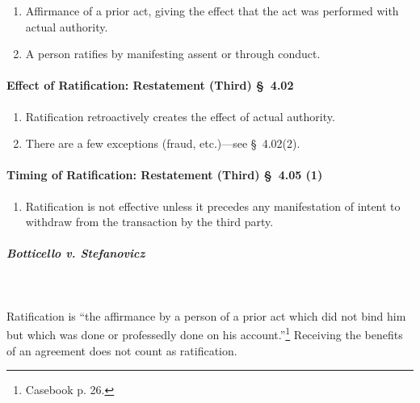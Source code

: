 \begin{enumerate}
    \item Affirmance of a prior act, giving the effect that the act was 
    performed with actual authority.
    \item A person ratifies by manifesting assent or through conduct.
\end{enumerate}

\paragraph{Effect of Ratification: Restatement (Third) \S\ 4.02}

\begin{enumerate}
    \item Ratification retroactively creates the effect of actual authority.
    \item There are a few exceptions (fraud, etc.)---see \S\ 4.02(2).
\end{enumerate}

\paragraph{Timing of Ratification: Restatement (Third) \S\ 4.05 (1)}

\begin{enumerate}
    \item Ratification is not effective unless it precedes any manifestation 
    of intent to withdraw from the transaction by the third party.
\end{enumerate}

\paragraph{\emph{Botticello v. Stefanovicz}}
\label{par:botticello}
~\\\\
Ratification is ``the affirmance by a person of a prior act which did not bind 
him but which was done or professedly done on his account.''\footnote{Casebook 
p. 26.} Receiving the benefits of an agreement does not count as ratification.

